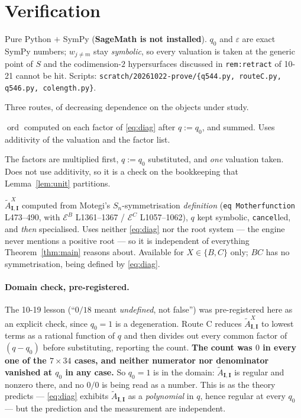 \documentclass[11pt]{article}
\theoremstyle{definition}
\theoremstyle{remark}
\DeclareMathOperator{\ord}{ord}
\newcommand{\At}{\widetilde{A}}
\newcommand{\bI}{\mathbf{I}}
\begin{document}
\section{Verification}
\label{sec:verif}

Pure Python $+$ SymPy (\textbf{SageMath is not installed}).  $q_0$ and $\varepsilon$ are
exact SymPy numbers; $w_{j\ne m}$ stay \emph{symbolic}, so every valuation is taken at the
generic point of $S$ and the codimension-$2$ hypersurfaces discussed in
\texttt{rem:retract} of 10-21 cannot be hit.  Scripts:
\texttt{scratch/20261022-prove/\{q544.py, routeC.py, q546.py, colength.py\}}.

Three routes, of decreasing dependence on the objects under study.

\begin{description}[leftmargin=1.4em]
\item[Route A --- factorwise.]  $\ord$ computed on each factor of
  \eqref{eq:diag} after $q:=q_0$, and summed.  Uses additivity of the valuation and the
  factor list.
\item[Route B --- whole product.]  The factors are multiplied first, $q:=q_0$ substituted,
  and \emph{one} valuation taken.  Does not use additivity, so it is a check on the
  bookkeeping that Lemma~\ref{lem:unit} partitions.
\item[Route C --- symmetrisation.]  $\At^{X}_{\bI,\bI}$ computed from Motegi's
  $S_n$-symmetrisation \emph{definition} (\texttt{eq Motherfunction} L473--490, with
  $\mathcal{E}^{B}$ L1361--1367 / $\mathcal{E}^{C}$ L1057--1062), $q$ kept symbolic,
  \texttt{cancel}led, and \emph{then} specialised.  Uses neither \eqref{eq:diag} nor the
  root system --- the engine never mentions a positive root --- so it is independent of
  everything Theorem~\ref{thm:main} reasons about.  Available for $X\in\{B,C\}$ only; $BC$
  has no symmetrisation, being defined by \eqref{eq:diag}.
\end{description}

\paragraph{Domain check, pre-registered.}
The 10-19 lesson (``$0/18$ meant \emph{undefined}, not false'') was pre-registered here as
an explicit check, since $q_0=1$ is a degeneration.  Route C reduces
$\At^{X}_{\bI,\bI}$ to lowest terms as a rational function of $q$ and then divides out
every common factor of $(q-q_0)$ before substituting, reporting the count.  \textbf{The
count was $0$ in every one of the $7\times34$ cases, and neither numerator nor denominator
vanished at $q_0$ in any case.}  So $q_0=1$ is in the domain: $\At_{\bI,\bI}$ is regular
and nonzero there, and no $0/0$ is being read as a number.  This is as the theory predicts
--- \eqref{eq:diag} exhibits $\At_{\bI,\bI}$ as a \emph{polynomial} in $q$, hence regular
at every $q_0$ --- but the prediction and the measurement are independent.
\end{document}
